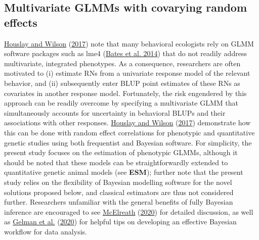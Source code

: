 \documentclass{article}
\begin{document}
\hypertarget{multivariate-glmms-with-covarying-random-effects}{%
\subsection{Multivariate GLMMs with covarying random
effects}\label{multivariate-glmms-with-covarying-random-effects}}

\protect\hyperlink{ref-Hous2017}{Houslay and Wilson}
(\protect\hyperlink{ref-Hous2017}{2017}) note that many behavioral
ecologists rely on GLMM software packages such as lme4
(\protect\hyperlink{ref-Bates2014}{Bates et al. 2014}) that do not
readily address multivariate, integrated phenotypes. As a consequence,
researchers are often motivated to (i) estimate RNs from a univariate
response model of the relevant behavior, and (ii) subsequently enter
BLUP point estimates of these RNs as covariates in another response
model. Fortunately, the risk engendered by this approach can be readily
overcome by specifying a multivariate GLMM that simultaneously accounts
for uncertainty in behavioral BLUPs and their associations with other
responses. \protect\hyperlink{ref-Hous2017}{Houslay and Wilson}
(\protect\hyperlink{ref-Hous2017}{2017}) demonstrate how this can be
done with random effect correlations for phenotypic and quantitative
genetic studies using both frequentist and Bayesian software. For
simplicity, the present study focuses on the estimation of phenotypic
GLMMs, although it should be noted that these models can be
straightforwardly extended to quantitative genetic animal models (see
\textbf{ESM}); further note that the present study relies on the
flexibility of Bayesian modelling software for the novel solutions
proposed below, and classical estimators are thus not considered
further. Researchers unfamiliar with the general benefits of fully
Bayesian inference are encouraged to see
\protect\hyperlink{ref-Rethinking}{McElreath}
(\protect\hyperlink{ref-Rethinking}{2020}) for detailed discussion, as
well as \protect\hyperlink{ref-Gelman2020}{Gelman et al.}
(\protect\hyperlink{ref-Gelman2020}{2020}) for helpful tips on
developing an effective Bayesian workflow for data analysis.
\end{document}
